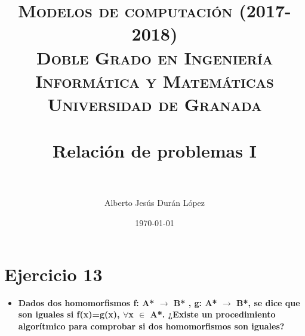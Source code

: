


\title{	
\normalfont \normalsize 
\textsc{\textbf{Modelos de computación (2017-2018)} \\ Doble Grado en Ingeniería Informática y Matemáticas \\ Universidad de Granada} \\ [25pt] %
\horrule{0.5pt} \\[0.4cm] %
\huge Relación de problemas I \\ %
\horrule{2pt} \\[0.5cm] %
}

\author{Alberto Jesús Durán López} %

\date{\normalsize\today} %




\maketitle %

\newpage %

\tableofcontents %



\newpage













\section{Ejercicio 13}
\begin{itemize}
	\item \textbf{Dados dos homomorfismos f: A* $\rightarrow$ B* , g: A* $\rightarrow$ B*, se dice que son iguales si f(x)=g(x), $\forall$x $\in$ A*. ¿Existe un procedimiento algorítmico para comprobar si dos homomorfismos son iguales?}
\end{itemize} 

